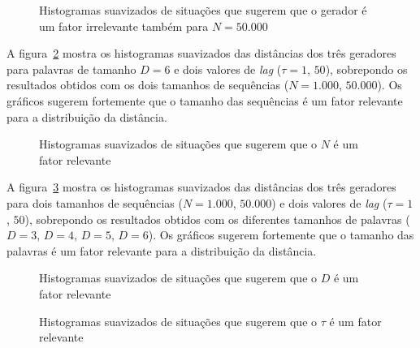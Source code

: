 \begin{figure} %
	\centering
		\caption{Histogramas suavizados de situações que sugerem que o gerador é um fator irrelevante também para $N=50.000$}\label{fig:GeradorIrrelevante50k}
\end{figure}

A figura~\ref{fig:NRelevante} mostra os histogramas suavizados das distâncias dos três geradores para palavras de tamanho $D=6$ e dois valores de \textit{lag} ($\tau=1$, $50$), sobrepondo os resultados obtidos com os dois tamanhos de sequências ($N=1.000$, $50.000$).
Os gráficos sugerem fortemente que o tamanho das sequências é um fator relevante para a distribuição da distância.

\begin{figure} %
	\centering
	\caption{Histogramas suavizados de situações que sugerem que o $N$ é um fator relevante}\label{fig:NRelevante}
\end{figure}

A figura~\ref{fig:DRelevante} mostra os histogramas suavizados das distâncias dos três geradores para dois tamanhos de sequências ($N=1.000$, $50.000$) e dois valores de \textit{lag} ($\tau=1$, $50$), sobrepondo os resultados obtidos com os diferentes tamanhos de palavras ($D=3$, $D=4$, $D=5$, $D=6$).
Os gráficos sugerem fortemente que o tamanho das palavras é um fator relevante para a distribuição da distância.

\begin{figure} %
	\centering
	\caption{Histogramas suavizados de situações que sugerem que o $D$ é um fator relevante}\label{fig:DRelevante}
\end{figure}



\begin{figure} %
	\centering
\caption{Histogramas suavizados de situações que sugerem que o $\tau$ é um fator relevante}\label{fig:tRelevante}
\end{figure}

